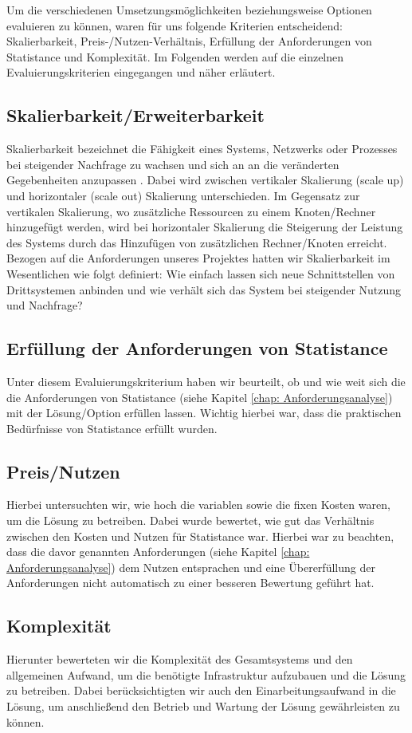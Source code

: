 Um die verschiedenen Umsetzungsmöglichkeiten beziehungsweise Optionen evaluieren zu können, waren für uns folgende Kriterien entscheidend: Skalierbarkeit, Preis-/Nutzen-Verhältnis, Erfüllung der Anforderungen von Statistance und Komplexität. Im Folgenden werden auf die einzelnen Evaluierungskriterien eingegangen und näher erläutert.

\subsection*{\textbf{Skalierbarkeit/Erweiterbarkeit}}\label{subsubsec:Skalierbarkeit/Erweiterbarkeit} 
Skalierbarkeit bezeichnet die Fähigkeit eines Systems, Netzwerks oder Prozesses bei steigender Nachfrage zu wachsen und sich an an die veränderten Gegebenheiten anzupassen \cite{skalierbarkeit}. Dabei wird zwischen vertikaler Skalierung (scale up) und horizontaler (scale out) Skalierung unterschieden. Im Gegensatz zur vertikalen Skalierung, wo zusätzliche Ressourcen zu einem Knoten/Rechner hinzugefügt werden, wird bei horizontaler Skalierung die Steigerung der Leistung des Systems durch das Hinzufügen von zusätzlichen Rechner/Knoten erreicht. Bezogen auf die Anforderungen unseres Projektes hatten wir Skalierbarkeit im Wesentlichen wie folgt definiert: Wie einfach lassen sich neue Schnittstellen von Drittsystemen anbinden und wie verhält sich das System bei steigender Nutzung und Nachfrage?

\subsection*{\textbf{Erfüllung der Anforderungen von Statistance}}\label{Erfüllung der Anforderungen von Statistance} 
Unter diesem Evaluierungskriterium haben wir beurteilt, ob und wie weit sich die
die Anforderungen von Statistance (siehe Kapitel \ref{chap: Anforderungsanalyse}) mit der Lösung/Option erfüllen lassen. Wichtig hierbei war, dass die praktischen Bedürfnisse von Statistance erfüllt wurden.

\subsection*{\textbf{Preis/Nutzen}}\label{Preis/Nutzen}
Hierbei untersuchten wir, wie hoch die variablen sowie die fixen Kosten waren, um die Lösung zu betreiben. Dabei wurde bewertet, wie gut das Verhältnis zwischen den Kosten und Nutzen für Statistance war. Hierbei war zu beachten, dass die davor genannten Anforderungen (siehe Kapitel \ref{chap: Anforderungsanalyse}) dem Nutzen entsprachen und eine Übererfüllung der Anforderungen nicht automatisch zu einer besseren Bewertung geführt hat. 

\subsection*{\textbf{Komplexität}}\label{Komplexität}
Hierunter bewerteten wir die Komplexität des Gesamtsystems und den allgemeinen Aufwand, um die benötigte Infrastruktur aufzubauen und die Lösung zu betreiben. Dabei berücksichtigten wir auch den Einarbeitungsaufwand in die Lösung, um anschließend den Betrieb und Wartung der Lösung gewährleisten zu können.
